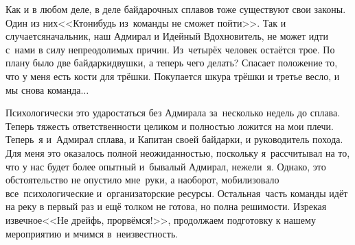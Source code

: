 Как и в любом деле, в деле байдарочных сплавов тоже существуют свои законы. Один из них\mdash <<Кто\sdash нибудь из~команды не сможет пойти>>. Так и случается\mdash начальник, наш Адмирал и Идейный Вдохновитель, не может идти с~нами в силу непреодолимых причин. Из~четырёх человек остаётся трое. По плану было две байдарки\sdash двушки, а теперь чего делать? Спасает положение то, что у меня есть кости для трёшки. Покупается шкура трёшки и третье весло, и мы снова команда$\ldots$
 
Психологически это удар\mdash остаться без Адмирала за~несколько недель до сплава. Теперь тяжесть ответственности целиком и полностью ложится на мои плечи. Теперь~я и~Адмирал сплава, и Капитан своей байдарки, и руководитель похода. Для меня это оказалось полной неожиданностью, поскольку я~рассчитывал на то, что у нас будет более опытный и~бывалый Адмирал, нежели~я. Однако, это обстоятельство не опустило мне~руки, а наоборот, мобилизовало все~психологические и~организаторские ресурсы. Остальная~часть команды идёт на реку в первый раз и ещё толком не готова, но полна решимости. Изрекая извечное\mdash <<Не дрейфь, прорвёмся!>>, продолжаем подготовку к нашему мероприятию и мчимся в~неизвестность. 

\begin{center}
\end{center}
